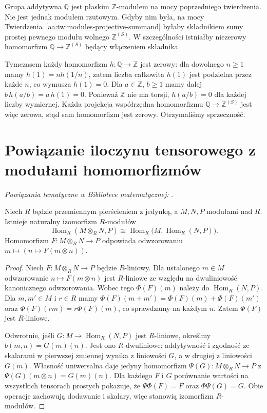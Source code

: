\begin{przyklad}
\label{aa:prz:flat-not-projective}
Grupa addytywna $\mathbb Q$ jest płaskim
$\mathbb Z$-modułem na mocy poprzedniego twierdzenia.
Nie jest jednak modułem rzutowym. Gdyby nim była,
na mocy Twierdzenia~\ref{aa:tw:modules-projective-summand}
byłaby składnikiem sumy prostej pewnego modułu wolnego
$\mathbb Z^{(S)}$. W szczególności istniałby
niezerowy homomorfizm $\mathbb Q\to\mathbb Z^{(S)}$
będący włączeniem składnika.

Tymczasem każdy homomorfizm $h:\mathbb Q\to\mathbb Z$
jest zerowy: dla dowolnego $n\ge1$ mamy
$h(1)=n h(1/n)$, zatem liczba całkowita $h(1)$
jest podzielna przez każde $n$, co wymusza $h(1)=0$.
Dla $a\in\mathbb Z$, $b\ge1$ mamy dalej
$b\,h(a/b)=a\,h(1)=0$. Ponieważ $\mathbb Z$
nie ma torsji, $h(a/b)=0$ dla każdej liczby wymiernej.
Każda projekcja współrzędna homomorfizmu
$\mathbb Q\to\mathbb Z^{(S)}$ jest więc zerowa,
stąd sam homomorfizm jest zerowy. Otrzymaliśmy sprzeczność.
\end{przyklad}

\section{Powiązanie iloczynu tensorowego z modułami homomorfizmów}

\noindent\emph{Powiązania tematyczne w Bibliotece matematycznej:} .

\begin{twierdzenie}
\label{aa:tw:tensor-hom-adjunction}
Niech $R$ będzie przemiennym pierścieniem z jedynką,
a $M,N,P$ modułami nad $R$. Istnieje naturalny
izomorfizm $R$-modułów
\[
\operatorname{Hom}_R(M\otimes_RN,P)\cong
\operatorname{Hom}_R\bigl(M,\operatorname{Hom}_R(N,P)\bigr).
\]
Homomorfizm $F:M\otimes_RN\to P$ odpowiada
odwzorowaniu $m\mapsto(n\mapsto F(m\otimes n))$.
\end{twierdzenie}
\begin{proof}
Niech $F:M\otimes_RN\to P$ będzie $R$-liniowy.
Dla ustalonego $m\in M$ odwzorowanie
$n\mapsto F(m\otimes n)$ jest $R$-liniowe
ze względu na dwuliniowość kanonicznego odwzorowania.
Wobec tego $\Phi(F)(m)$ należy do
$\operatorname{Hom}_R(N,P)$. Dla $m,m'\in M$
i $r\in R$ mamy
$\Phi(F)(m+m')=\Phi(F)(m)+\Phi(F)(m')$ oraz
$\Phi(F)(rm)=r\Phi(F)(m)$, co sprawdzamy na
każdym $n$. Zatem $\Phi(F)$ jest $R$-liniowe.

Odwrotnie, jeśli $G:M\to\operatorname{Hom}_R(N,P)$
jest $R$-liniowe, określmy $b(m,n)=G(m)(n)$.
Jest ono $R$-dwuliniowe: addytywność i zgodność
ze skalarami w pierwszej zmiennej wynika z
liniowości $G$, a w drugiej z liniowości $G(m)$.
Własność uniwersalna daje jedyny homomorfizm
$\Psi(G):M\otimes_RN\to P$ z
$\Psi(G)(m\otimes n)=G(m)(n)$.
Dla każdego $F$ i $G$ porównanie wartości na
wszystkich tensorach prostych pokazuje, że
$\Psi\Phi(F)=F$ oraz $\Phi\Psi(G)=G$.
Obie operacje zachowują dodawanie i skalary,
więc stanowią izomorfizm $R$-modułów.
\end{proof}

